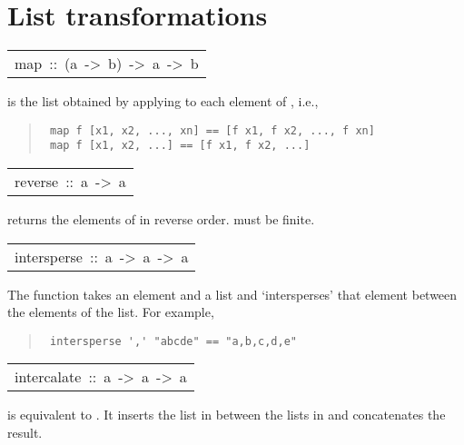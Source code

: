 \section{List transformations
}
\begin{haddockdesc}
\item[\begin{tabular}{@{}l}
map\ ::\ (a\ ->\ b)\ ->\ {\char 91}a{\char 93}\ ->\ {\char 91}b{\char 93}
\end{tabular}]\haddockbegindoc
{}  is the list obtained by applying  to each element
 of , i.e.,
\par
\begin{quote}
{\haddockverb\begin{verbatim}
 map f [x1, x2, ..., xn] == [f x1, f x2, ..., f xn]
 map f [x1, x2, ...] == [f x1, f x2, ...]
\end{verbatim}}
\end{quote}

\end{haddockdesc}
\begin{haddockdesc}
\item[\begin{tabular}{@{}l}
reverse\ ::\ {\char 91}a{\char 93}\ ->\ {\char 91}a{\char 93}
\end{tabular}]\haddockbegindoc
{}  returns the elements of  in reverse order.
  must be finite.
\par

\end{haddockdesc}
\begin{haddockdesc}
\item[\begin{tabular}{@{}l}
intersperse\ ::\ a\ ->\ {\char 91}a{\char 93}\ ->\ {\char 91}a{\char 93}
\end{tabular}]\haddockbegindoc
The  function takes an element and a list and
 `intersperses' that element between the elements of the list.
 For example,
\par
\begin{quote}
{\haddockverb\begin{verbatim}
 intersperse ',' "abcde" == "a,b,c,d,e"
\end{verbatim}}
\end{quote}

\end{haddockdesc}
\begin{haddockdesc}
\item[\begin{tabular}{@{}l}
intercalate\ ::\ {\char 91}a{\char 93}\ ->\ {\char 91}{\char 91}a{\char 93}{\char 93}\ ->\ {\char 91}a{\char 93}
\end{tabular}]\haddockbegindoc
{}  is equivalent to .
 It inserts the list  in between the lists in  and concatenates the
 result.
\par

\end{haddockdesc}
